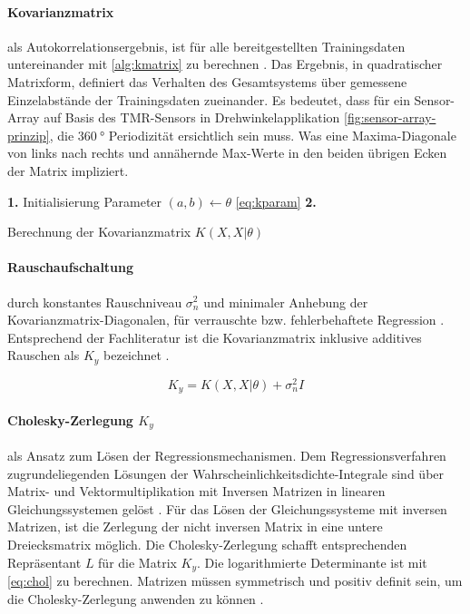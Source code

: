 \paragraph*{Kovarianzmatrix} als Autokorrelationsergebnis, ist für alle bereitgestellten Trainingsdaten untereinander mit \autoref{alg:kmatrix} zu berechnen \cite{Rasmussen2006}. Das Ergebnis, in quadratischer Matrixform, definiert das Verhalten des Gesamtsystems über gemessene Einzelabstände der Trainingsdaten zueinander. Es bedeutet, dass für ein Sensor-Array auf Basis des TMR-Sensors \cite{TDK2016} in Drehwinkelapplikation \autoref{fig:sensor-array-prinzip}, die $\SI{360}{\degree}$ Periodizität ersichtlich sein muss. Was eine Maxima-Diagonale von links nach rechts und annähernde Max-Werte in den beiden übrigen Ecken der Matrix impliziert.


\begin{algorithm}[h]
	\SetAlgoLined
	\textbf{1.} Initialisierung Parameter $(a,b) \leftarrow \theta$ \autoref{eq:kparam}\;
	\textbf{2.} 
	\caption{Berechnung der Kovarianzmatrix $K(X, X|\theta)$}
	\label{alg:kmatrix}
\end{algorithm}


\paragraph*{Rauschaufschaltung} durch konstantes Rauschniveau $\sigma_n^2$ und minimaler Anhebung der Kovarianzmatrix-Diagonalen, für verrauschte bzw. fehlerbehaftete Regression \cite{Rasmussen2006}. Entsprechend der Fachliteratur ist die Kovarianzmatrix inklusive additives Rauschen als $K_y$ bezeichnet \cite{Rasmussen2006}.


\begin{equation}\label{eq:addnoise}
	K_y = K(X, X|\theta) + \sigma_n^2 I
\end{equation}


\paragraph*{Cholesky-Zerlegung $K_y$} als Ansatz zum Lösen der Regressionsmechanismen. Dem Regressionsverfahren zugrundeliegenden Lösungen der Wahrscheinlichkeitsdichte-Integrale sind über Matrix- und Vektormultiplikation mit Inversen Matrizen in linearen Gleichungssystemen gelöst \cite{Rasmussen2006}. Für das Lösen der Gleichungssysteme mit inversen Matrizen, ist die Zerlegung der nicht inversen Matrix in eine untere Dreiecksmatrix möglich. Die Cholesky-Zerlegung schafft entsprechenden Repräsentant $L$ für die Matrix $K_y$. Die logarithmierte Determinante ist mit \autoref{eq:chol} zu berechnen. Matrizen müssen symmetrisch und positiv definit sein, um die Cholesky-Zerlegung anwenden zu können \cite{Rasmussen2006}.


